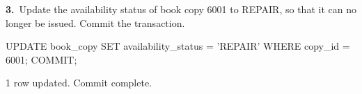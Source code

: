 \noindent\begin{minipage}{\linewidth}
\begingroup{}
{\fontsize{14}{17}\selectfont\textbf{3.}}\ Update the availability status of book copy 6001 to REPAIR, so that it can no longer be issued. Commit the transaction.\par
\endgroup\vspace{12pt}


\begin{sqlcode}
UPDATE book_copy SET availability_status = 'REPAIR'
WHERE copy_id = 6001;
COMMIT;
\end{sqlcode}

\vspace{18pt}


\begin{sqlout}[fontsize=\small]
1 row updated.
Commit complete.
\end{sqlout}
\end{minipage}\par\vspace{24pt}

